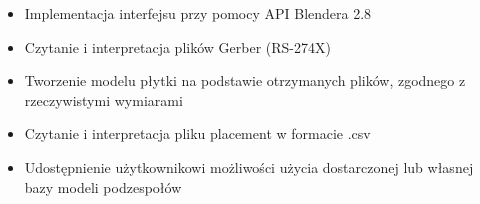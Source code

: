 \documentclass[brudnopis]{xmgr}
\begin{document}
\begin{itemize}

\item Implementacja interfejsu przy pomocy API Blendera 2.8

\item Czytanie i interpretacja plików Gerber (RS-274X)


\item Tworzenie modelu płytki na podstawie otrzymanych plików, zgodnego z rzeczywistymi wymiarami

\item Czytanie i interpretacja pliku placement w formacie .csv


\item Udostępnienie użytkownikowi możliwości użycia dostarczonej lub własnej bazy modeli podzespołów
%

\end{itemize}
\end{document}
